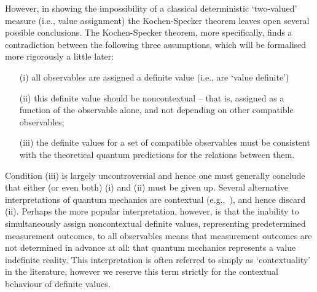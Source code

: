 \documentclass[%
 superscriptaddress,
 preprint,
 showpacs,
 showkeys,
 nofootinbib,
  amsmath,amssymb,
  aps,
  longbibliography,
  floatfix,
 ]{revtex4-1}
\theoremstyle{definition}
\begin{document}
However, in showing the impossibility of a classical deterministic `two-valued' measure (i.e., value assignment)
the Kochen-Specker theorem leaves open several possible conclusions.
The Kochen-Specker theorem, more specifically, finds a contradiction between the following three assumptions, which will be formalised more rigorously a little later:
\begin{itemize}
\item[(i)] all observables are assigned a definite value (i.e., are `value definite')
\item[(ii)] this definite value should be noncontextual -- that is, assigned as a function of the observable alone, and not depending on other compatible observables;
\item[(iii)] the definite values for a set of compatible observables must be consistent with the theoretical quantum predictions for the relations between them.
\end{itemize}
Condition (iii) is largely uncontroversial and hence one must generally conclude that either (or even both) (i) and (ii) must be given up.
Several alternative interpretations of quantum mechanics are contextual (e.g.,~\cite{Bohm:1952aa}), and hence discard (ii).
Perhaps the more popular interpretation, however, is that %
the inability to simultaneously assign noncontextual definite values, representing predetermined measurement outcomes, to all observables means that measurement outcomes are not determined in advance at all: that quantum mechanics represents a value indefinite reality.
This interpretation is often referred to simply as `contextuality' in the literature, however we reserve this term strictly for the contextual behaviour of definite values.
\end{document}
